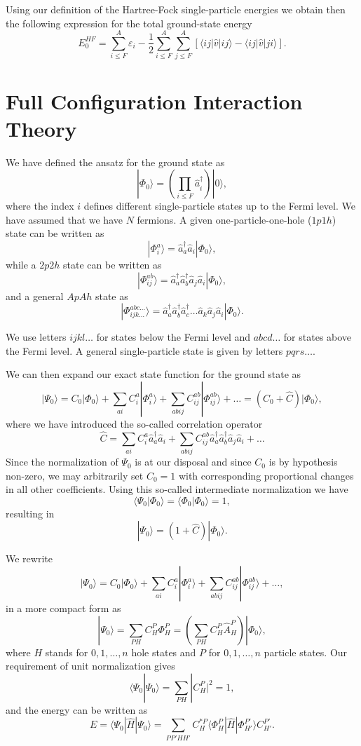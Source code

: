 Using our definition of the Hartree-Fock single-particle energies we
obtain then the following expression for the total ground-state energy
\[
  E_0^{HF}
  = \sum_{i\le F}^A \varepsilon_i - \frac{1}{2}\sum_{i\le F}^A\sum_{j \le F}^A\left[\langle ij |\hat{v}|ij \rangle-\langle ij|\hat{v}|ji\rangle\right].
\]


\section{Full Configuration Interaction Theory}

We have defined the ansatz for the ground state as 
\[
|\Phi_0\rangle = \left(\prod_{i\le F}\hat{a}_{i}^{\dagger}\right)|0\rangle,
\]
where the index $i$ defines different single-particle states up to the Fermi level. We have assumed that we have $N$ fermions. 
A given one-particle-one-hole ($1p1h$) state can be written as
\[
|\Phi_i^a\rangle = \hat{a}_{a}^{\dagger}\hat{a}_i|\Phi_0\rangle,
\]
while a $2p2h$ state can be written as
\[
|\Phi_{ij}^{ab}\rangle = \hat{a}_{a}^{\dagger}\hat{a}_{b}^{\dagger}\hat{a}_j\hat{a}_i|\Phi_0\rangle,
\]
and a general $ApAh$ state as 
\[
|\Phi_{ijk\dots}^{abc\dots}\rangle = \hat{a}_{a}^{\dagger}\hat{a}_{b}^{\dagger}\hat{a}_{c}^{\dagger}\dots\hat{a}_k\hat{a}_j\hat{a}_i|\Phi_0\rangle.
\]

We use letters $ijkl\dots$ for states below the Fermi level and $abcd\dots$ for states above the Fermi level. A general single-particle state is given by letters $pqrs\dots$.

We can then expand our exact state function for the ground state 
as
\[
|\Psi_0\rangle=C_0|\Phi_0\rangle+\sum_{ai}C_i^a|\Phi_i^a\rangle+\sum_{abij}C_{ij}^{ab}|\Phi_{ij}^{ab}\rangle+\dots
=(C_0+\hat{C})|\Phi_0\rangle,
\]
where we have introduced the so-called correlation operator 
\[
\hat{C}=\sum_{ai}C_i^a\hat{a}_{a}^{\dagger}\hat{a}_i  +\sum_{abij}C_{ij}^{ab}\hat{a}_{a}^{\dagger}\hat{a}_{b}^{\dagger}\hat{a}_j\hat{a}_i+\dots
\]
Since the normalization of $\Psi_0$ is at our disposal and since $C_0$ is by hypothesis non-zero, we may arbitrarily set $C_0=1$ with 
corresponding proportional changes in all other coefficients. Using this so-called intermediate normalization we have
\[
\langle \Psi_0 | \Phi_0 \rangle = \langle \Phi_0 | \Phi_0 \rangle = 1, 
\]
resulting in 
\[
|\Psi_0\rangle=(1+\hat{C})|\Phi_0\rangle.
\]


We rewrite 
\[
|\Psi_0\rangle=C_0|\Phi_0\rangle+\sum_{ai}C_i^a|\Phi_i^a\rangle+\sum_{abij}C_{ij}^{ab}|\Phi_{ij}^{ab}\rangle+\dots,
\]
in a more compact form as 
\[
|\Psi_0\rangle=\sum_{PH}C_H^P\Phi_H^P=\left(\sum_{PH}C_H^P\hat{A}_H^P\right)|\Phi_0\rangle,
\]
where $H$ stands for $0,1,\dots,n$ hole states and $P$ for $0,1,\dots,n$ particle states. 
Our requirement of unit normalization gives
\[
\langle \Psi_0 | \Psi_0 \rangle = \sum_{PH}|C_H^P|^2= 1,
\]
and the energy can be written as 
\[
E= \langle \Psi_0 | \hat{H} |\Psi_0 \rangle= \sum_{PP'HH'}C_H^{*P}\langle \Phi_H^P | \hat{H} |\Phi_{H'}^{P'} \rangle C_{H'}^{P'}.
\]


